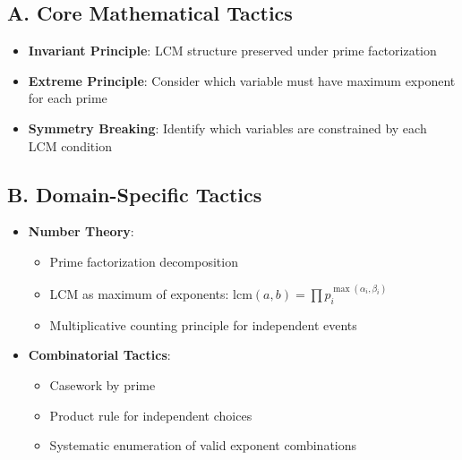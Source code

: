 \documentclass[12pt]{article}
\begin{document}
\begin{tacticalbox}
\subsection*{A. Core Mathematical Tactics}
\begin{itemize}[leftmargin=*]
    \item \textbf{Invariant Principle}: LCM structure preserved under prime factorization
    \item \textbf{Extreme Principle}: Consider which variable must have maximum exponent for each prime
    \item \textbf{Symmetry Breaking}: Identify which variables are constrained by each LCM condition
\end{itemize}

\subsection*{B. Domain-Specific Tactics}
\begin{itemize}[leftmargin=*]
    \item \textbf{Number Theory}:
    \begin{itemize}
        \item Prime factorization decomposition
        \item LCM as maximum of exponents: $\text{lcm}(a,b) = \prod p_i^{\max(\alpha_i, \beta_i)}$
        \item Multiplicative counting principle for independent events
    \end{itemize}
    \item \textbf{Combinatorial Tactics}:
    \begin{itemize}
        \item Casework by prime
        \item Product rule for independent choices
        \item Systematic enumeration of valid exponent combinations
    \end{itemize}
\end{itemize}
\end{tacticalbox}
\end{document}
